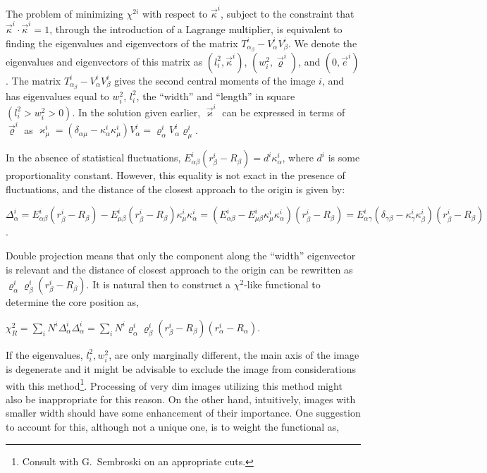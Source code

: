 \documentclass[letterpaper]{article}
\begin{document}
The problem of minimizing $\chi^{2i}$ with respect to
$\vec{\kappa}^{i}$, subject to the constraint that
$\vec{\kappa}^{i}\cdot\vec{\kappa}^{i}=1$, through the introduction of
a Lagrange multiplier, is equivalent to finding the eigenvalues and
eigenvectors of the matrix
$T_{\alpha_{\beta}}^{i}-V_{\alpha}^{i}V_{\beta}^{i}$. We denote the
eigenvalues and eigenvectors of this matrix as
$\left(l_{i}^{2},\vec{\kappa}^{i}\right)$,
$\left(w_{i}^{2},\vec{\varrho}^{i}\right)$, and
$\left(0,\vec{e}^{i}\right)$. The matrix
$T_{\alpha_{\beta}}^{i}-V_{\alpha}^{i}V_{\beta}^{i}$ gives the second
central moments of the image $i$, and has eigenvalues equal to
$w_{i}^{2}$, $l_{i}^{2}$, the ``width'' and ``length'' in square
$\left(l_{i}^{2}>w_{i}^{2}>0\right)$. In the solution given earlier,
$\vec{\varkappa}^{i}$ can be expressed in terms of $\vec{\varrho}^{i}$
as $\varkappa_{\mu}^{i}=\left(\delta_{\alpha\mu}
-\kappa_{\alpha}^{i}\kappa_{\mu}^{i}\right)V_{\alpha}^{i}
=\varrho_{\alpha}^{i}V_{\alpha}^{i}\varrho_{\mu}^{i}$.

In the absence of statistical fluctuations,
$E_{\alpha\beta}^{i}(r_{\beta}^{i}-R_{\beta})=d^{i}\kappa_{\alpha}^{i}$,
where $d^{i}$ is some proportionality constant. However, this equality
is not exact in the presence of fluctuations, and the distance of the
closest approach to the origin is given by:

$\displaystyle 
\Delta_{\alpha}^i = E_{\alpha\beta}^{i}(r_{\beta}^{i}-R_{\beta})-E_{\mu
\beta}^{i}(r_{\beta}^{i}-R_{\beta})\kappa_{\mu}^{i}\kappa_{\alpha}^{i}
= \left(E_{\alpha\beta}^{i}-E_{\mu\beta}^{i}
\kappa_{\mu}^{i}\kappa_{\alpha}^{i}\right)(r_{\beta}^{i}-R_{\beta})
= E_{\alpha\gamma}^{i}\left(\delta_{\gamma\beta}
-\kappa_{\gamma}^{i}\kappa_{\beta}^{i}\right)(r_{\beta}^{i}-R_{\beta})$.

Double projection means that only the component along the ``width''
eigenvector is relevant and the distance of closest approach to the
origin can be rewritten as
$\varrho_{\alpha}^{i}\varrho_{\beta}^{i}(r_{\beta}^{i}-R_{\beta})$. It
is natural then to construct a $\chi^{2}$-like functional to determine the
core position as,

$\displaystyle \chi_{R}^{2}
=\sum\limits_{i}N^{i}\Delta_{\alpha}^i\Delta_{\alpha}^i
=\sum\limits_{i}N^{i}\varrho_{\alpha}^{i}\varrho_{\beta}^{i}(r_{\beta}^{i}
-R_{\beta})(r_{\alpha}^{i}-R_{\alpha})$.

If the eigenvalues, $l_{i}^{2},w_{i}^{2}$, are only marginally
different, the main axis of the image is degenerate and it might be
advisable to exclude the image from considerations with this
method\footnote{Consult with G.~Sembroski on an appropriate
cuts.}. Processing of very dim images utilizing this method might also
be inappropriate for this reason. On the other hand, intuitively,
images with smaller width should have some enhancement of their
importance. One suggestion to account for this, although not a unique
one, is to weight the functional as,
\end{document}
